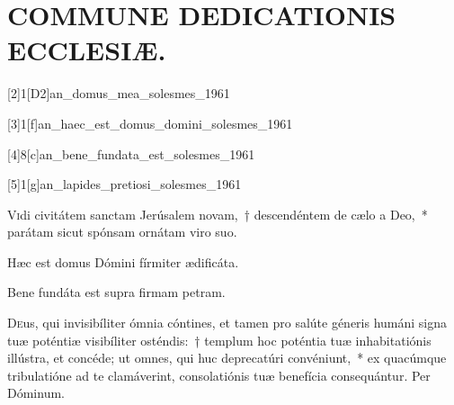 \documentclass[vesperale_romanum.tex]{subfiles}
\begin{document}
\section[Commune Dedicationis Ecclesiæ]{COMMUNE DEDICATIONIS ECCLESIÆ.}

\thispagestyle{empty}



[2]{1}[D2]{an_domus_mea_solesmes_1961}


[3]{1}[f]{an_haec_est_domus_domini_solesmes_1961}

[4]{8}[c]{an_bene_fundata_est_solesmes_1961}


[5]{1}[g]{an_lapides_pretiosi_solesmes_1961}

\label{cap_ded_ecc}

\lettrine{V}{i}di civitátem sanctam Jerúsalem novam,~† descendéntem de cælo a Deo,~* parátam sicut spónsam ornátam viro suo.

\hymnus


\vv Hæc est domus Dómini fírmiter ædificáta.

\rr Bene fundáta est supra firmam petram.


\oratio


\lettrine{D}{e}us, qui invisibíliter ómnia cóntines, et tamen pro salúte géneris humáni signa tuæ poténtiæ visibíliter osténdis:~† templum hoc poténtia tuæ inhabitatiónis illústra, et concéde; ut omnes, qui huc deprecatúri convéniunt,~* ex quacúmque tribulatióne ad te clamáverint, consolatiónis tuæ benefícia consequántur. Per Dóminum.
\end{document}
